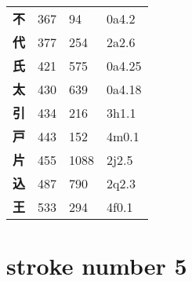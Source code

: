\begin{longtable}[c]{llll}
    \bfseries 不 & 367 & 94 & 0a4.2\\
    \bfseries 代 & 377 & 254 & 2a2.6\\
    \bfseries 氏 & 421 & 575 & 0a4.25\\
    \bfseries 太 & 430 & 639 & 0a4.18\\
    \bfseries 引 & 434 & 216 & 3h1.1\\
    \bfseries 戸 & 443 & 152 & 4m0.1\\
    \bfseries 片 & 455 & 1088 & 2j2.5\\
    \bfseries 込 & 487 & 790 & 2q2.3\\
    \bfseries 王 & 533 & 294 & 4f0.1\\
  \end{longtable}
\section{stroke number 5}
